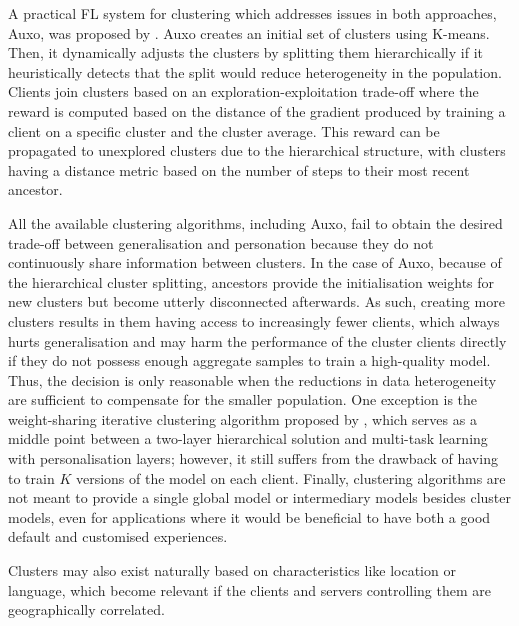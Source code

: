 A practical FL system for clustering which addresses issues in both approaches, Auxo, was proposed by \citet{Auxo}. Auxo creates an initial set of clusters using K-means. Then, it dynamically adjusts the clusters by splitting them hierarchically if it heuristically detects that the split would reduce heterogeneity in the population. Clients join clusters based on an exploration-exploitation trade-off where the reward is computed based on the distance of the gradient produced by training a client on a specific cluster and the cluster average. This reward can be propagated to unexplored clusters due to the hierarchical structure, with clusters having a distance metric based on the number of steps to their most recent ancestor.

All the available clustering algorithms, including Auxo,  fail to obtain the desired trade-off between generalisation and personation because they do not continuously share information between clusters. In the case of Auxo, because of the hierarchical cluster splitting, ancestors provide the initialisation weights for new clusters but become utterly disconnected afterwards. As such, creating more clusters results in them having access to increasingly fewer clients, which always hurts generalisation and may harm the performance of the cluster clients directly if they do not possess enough aggregate samples to train a high-quality model. Thus, the decision is only reasonable when the reductions in data heterogeneity are sufficient to compensate for the smaller population. One exception is the weight-sharing iterative clustering algorithm proposed by \citet{AnEfficientFrameworkForClusteredFL}, which serves as a middle point between a two-layer hierarchical solution and multi-task learning with personalisation layers; however, it still suffers from the drawback of having to train $K$ versions of the model on each client. Finally, clustering algorithms are not meant to provide a single global model or intermediary models besides cluster models, even for applications where it would be beneficial to have both a good default and customised experiences.

Clusters may also exist naturally based on characteristics like location or language, which become relevant if the clients and servers controlling them are geographically correlated.


